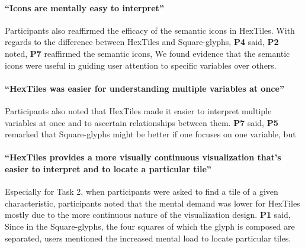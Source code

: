 \paragraph{``Icons are mentally easy to interpret''}
Participants also reaffirmed the efficacy of the semantic icons in HexTiles.
%
With regards to the difference between HexTiles and Square-glyphs, \textbf{P4} said, 
%
\textbf{P2} noted, 
%
\textbf{P7} reaffirmed the semantic icons, 
%
We found evidence that the semantic icons were useful in guiding user attention to specific variables over others.

\paragraph{``HexTiles was easier for understanding multiple variables at once''}
Participants also noted that HexTiles made it easier to interpret multiple variables at once and to ascertain relationships between them.
%
\textbf{P7} said, 
%
\textbf{P5} remarked that Square-glyphs might be better if one focuses on one variable, but 

\paragraph{``HexTiles provides a more visually continuous visualization that's easier to interpret and to locate a particular tile''}
Especially for Task 2, when participants were asked to find a tile of a given characteristic, participants noted that the mental demand was lower for HexTiles mostly due to the more continuous nature of the visualization design.
%
\textbf{P1} said, 
%
Since in the Square-glyphs, the four squares of which the glyph is composed are separated, users mentioned the increased mental load to locate particular tiles.

